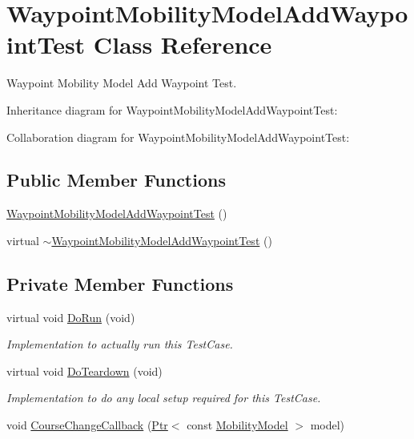 \hypertarget{classWaypointMobilityModelAddWaypointTest}{}\section{Waypoint\+Mobility\+Model\+Add\+Waypoint\+Test Class Reference}
\label{classWaypointMobilityModelAddWaypointTest}


Waypoint Mobility Model Add Waypoint Test.  




Inheritance diagram for Waypoint\+Mobility\+Model\+Add\+Waypoint\+Test\+:


Collaboration diagram for Waypoint\+Mobility\+Model\+Add\+Waypoint\+Test\+:
\subsection*{Public Member Functions}
\begin{DoxyCompactItemize}
\item 
\hyperlink{classWaypointMobilityModelAddWaypointTest_a4a8614f6297ad67cc18e5230b1a4f3c7}{Waypoint\+Mobility\+Model\+Add\+Waypoint\+Test} ()
\item 
virtual \hyperlink{classWaypointMobilityModelAddWaypointTest_a2948a47e95842bd5675c34967a34e678}{$\sim$\+Waypoint\+Mobility\+Model\+Add\+Waypoint\+Test} ()
\end{DoxyCompactItemize}
\subsection*{Private Member Functions}
\begin{DoxyCompactItemize}
\item 
virtual void \hyperlink{classWaypointMobilityModelAddWaypointTest_afab2502065d56508a1c71a8c78115c25}{Do\+Run} (void)
\begin{DoxyCompactList}\small\item\em Implementation to actually run this Test\+Case. \end{DoxyCompactList}\item 
virtual void \hyperlink{classWaypointMobilityModelAddWaypointTest_a09b843f485f9d57f99dbf09cdfc1364f}{Do\+Teardown} (void)
\begin{DoxyCompactList}\small\item\em Implementation to do any local setup required for this Test\+Case. \end{DoxyCompactList}\item 
void \hyperlink{classWaypointMobilityModelAddWaypointTest_a1863491f2b06dd60f4eefb1fbda45c71}{Course\+Change\+Callback} (\hyperlink{classns3_1_1Ptr}{Ptr}$<$ const \hyperlink{classns3_1_1MobilityModel}{Mobility\+Model} $>$ model)
\end{DoxyCompactItemize}
